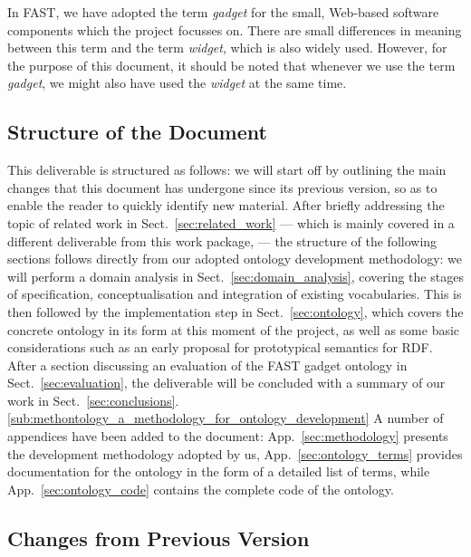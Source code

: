 \documentclass{article}
\begin{document}
In FAST, we have adopted the term \emph{gadget} for the small, Web-based software components which the project focusses on. There are small differences in meaning between this term and the term \emph{widget}, which is also widely used. However, for the purpose of this document, it should be noted that whenever we use the term \emph{gadget}, we might also have used the \emph{widget} at the same time.


\subsection{Structure of the Document} %
\label{sub:structure_of_the_document}

This deliverable is structured as follows: 
we will start off by outlining the main changes that this document has undergone since its previous version, so as to enable the reader to quickly identify new material.
After briefly addressing the topic of related work in Sect.~\ref{sec:related_work} --- which is mainly covered in a different deliverable from this work package, \cite{urmetzer2010fast_state_of_the_art} --- the structure of the following sections follows directly from our adopted ontology development methodology: we will perform a domain analysis in Sect.~\ref{sec:domain_analysis}, covering the stages of specification, conceptualisation and integration of existing vocabularies. This is then followed by the implementation step in Sect.~\ref{sec:ontology}, which covers the concrete ontology in its form at this moment of the project, as well as some basic considerations such as an early proposal for prototypical semantics for RDF. 
After a section discussing an evaluation of the FAST gadget ontology in Sect.~\ref{sec:evaluation}, the deliverable will be concluded with a summary of our work in Sect.~\ref{sec:conclusions}.\ref{sub:methontology_a_methodology_for_ontology_development}
A number of appendices have been added to the document: App.~\ref{sec:methodology} presents the development methodology adopted by us, App.~\ref{sec:ontology_terms} provides documentation for the ontology in the form of a detailed list of terms, while App.~\ref{sec:ontology_code} contains the complete code of the ontology.


\subsection{Changes from Previous Version} %
\label{sub:changes_from_previous_version}
\end{document}

